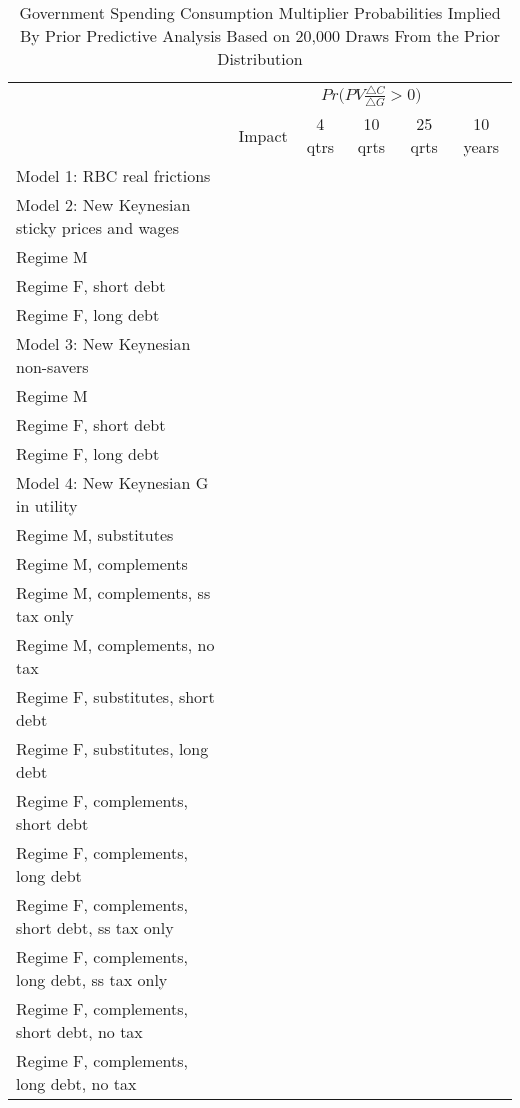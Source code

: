 \documentclass[letterpaper,12pt]{article}%
\begin{document}
\begin{table}[H]
    \centering
     \caption{Government Spending Consumption Multiplier Probabilities Implied By Prior Predictive Analysis Based on 20,000 Draws From the Prior Distribution}
    \begin{tabular}{l c c c c c}
    \toprule
        & \multicolumn{5}{c}{$Pr\Big(PV \frac{\triangle C}{\triangle G}>0\Big)$}\\
        \cmidrule{2-6}
        & Impact & 4 qtrs & 10 qrts & 25 qrts & 10 years \\
        \midrule
     Model 1: RBC real frictions &    &   &   &   &  \\
     Model 2: New Keynesian sticky prices and wages    &    &   &   &   &  \\
     \quad Regime M &    &   &   &   &  \\
     \quad Regime F, short debt &    &   &   &   &  \\
     \quad Regime F, long debt &    &   &   &   &  \\
     Model 3: New Keynesian non-savers &    &   &   &   &  \\
     \quad Regime M &    &   &   &   &  \\
     \quad Regime F, short debt &    &   &   &   &  \\
     \quad Regime F, long debt &    &   &   &   &  \\
     Model 4: New Keynesian G in utility &    &   &   &   &  \\
     \quad Regime M, substitutes &    &   &   &   &  \\
     \quad Regime M, complements &    &   &   &   &  \\
     \quad Regime M, complements, ss tax only &    &   &   &   &  \\
     \quad Regime M, complements, no tax &    &   &   &   &  \\
     \quad Regime F, substitutes, short debt &    &   &   &   &  \\
     \quad Regime F, substitutes, long debt &    &   &   &   &  \\
     \quad Regime F, complements, short debt &    &   &   &   &  \\
     \quad Regime F, complements, long debt &    &   &   &   &  \\
     \quad Regime F, complements, short debt, ss tax only &    &   &   &   &  \\
     \quad Regime F, complements, long debt, ss tax only &    &   &   &   &  \\
     \quad Regime F, complements, short debt, no tax &    &   &   &   &  \\
     \quad Regime F, complements, long debt, no tax &    &   &   &   &  \\
    \bottomrule    
    \end{tabular}
    \label{tab:my_label}
\end{table}
\end{document}
